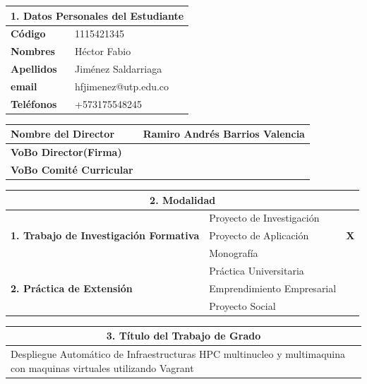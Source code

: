 \documentclass[letter,12pt]{article}
\begin{document}
\sloppy %
\renewcommand{\arraystretch}{1.1} %
\begin{center}
\begin{tabular}{|p{5.5cm}|p{9.5cm}|}
\hline
\multicolumn{2}{|c|}{\textbf{1. Datos Personales del Estudiante}}\\
\hline
\textbf{Código} & 1115421345 \\
\hline
\textbf{Nombres} & Héctor Fabio\\
\hline
\textbf{Apellidos} & Jiménez Saldarriaga\\
\hline
\textbf{email} & hfjimenez@utp.edu.co \\
\hline
\textbf{Teléfonos} &  +573175548245 \\
\hline
\end{tabular}
\end{center}

\begin{center}
\begin{tabular}{|p{5.5cm}|p{9.5cm}|}
\hline
\textbf{Nombre del Director} & Ramiro Andrés Barrios Valencia \\
\hline
\textbf{VoBo Director(Firma)} &  \\
\hline
\textbf{VoBo Comité Curricular} &  \\
\hline
\end{tabular}
\end{center}
\begin{center}
\begin{tabular}{|p{5.5cm}|p{8.5cm}|p{0.5cm}|}
\hline
\multicolumn{3}{|c|}{\textbf{2. Modalidad}}\\
\hline
\multirow{3}{5cm}{\textbf{1. Trabajo de Investigación Formativa}} & Proyecto de Investigación &  \\ \cline{2-3}
& Proyecto de Aplicación &  \textbf{X}\\ \cline{2-3}
& Monografía &  \\ 
\hline
\multirow{3}{5cm}{\textbf{2. Práctica de Extensión}} & Práctica Universitaria &  \\ \cline{2-3}
& Emprendimiento Empresarial &  \\ \cline{2-3}
& Proyecto Social &  \\
\hline
\end{tabular}
\end{center}
\newpage
\begin{center}
\begin{tabular}{|p{15.5cm}|}
\hline
\multicolumn{1}{|c|}{ \textbf{3. Título del Trabajo de Grado}}\\
\hline
Despliegue Automático de Infraestructuras HPC multinucleo y multimaquina con maquinas virtuales utilizando Vagrant\\
\hline
\end{tabular}
\end{center}
    
\end{document}

